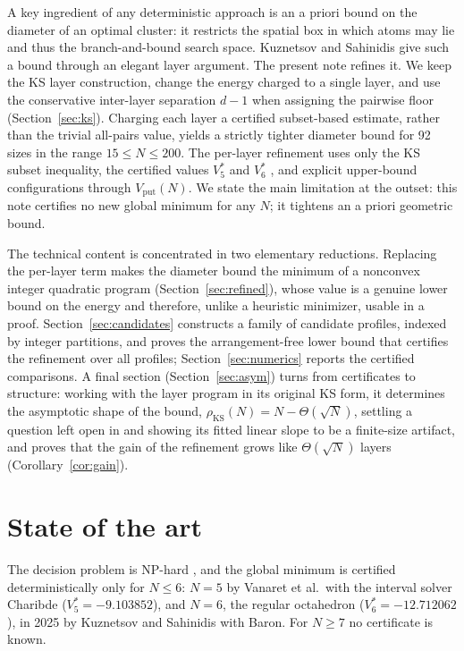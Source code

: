 \documentclass[11pt]{article}
\theoremstyle{remark}
\newcommand{\KS}{\mathrm{KS}}
\newcommand{\vput}{\mathrm{put}}
\begin{document}
A key ingredient of any deterministic approach is an a priori bound on the diameter of an optimal cluster: it restricts the spatial box in which atoms may lie and thus the branch-and-bound search space. Kuznetsov and Sahinidis \cite{ks2025} give such a bound through an elegant layer argument. The present note refines it. We keep the KS layer construction, change the energy charged to a single layer, and use the conservative inter-layer separation $d-1$ when assigning the pairwise floor (Section~\ref{sec:ks}). Charging each layer a certified subset-based estimate, rather than the trivial all-pairs value, yields a strictly tighter diameter bound for 92 sizes in the range $15\le N\le 200$. The per-layer refinement uses only the KS subset inequality, the certified values $V^*_5$ \cite{vanaret2014} and $V^*_6$ \cite{ks2025}, and explicit upper-bound configurations through $V_\vput(N)$. We state the main limitation at the outset: this note certifies no new global minimum for any $N$; it tightens an a priori geometric bound.

The technical content is concentrated in two elementary reductions. Replacing the per-layer term makes the diameter bound the minimum of a nonconvex integer quadratic program (Section~\ref{sec:refined}), whose value is a genuine lower bound on the energy and therefore, unlike a heuristic minimizer, usable in a proof. Section~\ref{sec:candidates} constructs a family of candidate profiles, indexed by integer partitions, and proves the arrangement-free lower bound that certifies the refinement over all profiles; Section~\ref{sec:numerics} reports the certified comparisons. A final section (Section~\ref{sec:asym}) turns from certificates to structure: working with the layer program in its original KS form, it determines the asymptotic shape of the bound, $\rho_\KS(N)=N-\Theta(\sqrt N)$, settling a question left open in \cite{ks2025} and showing its fitted linear slope to be a finite-size artifact, and proves that the gain of the refinement grows like $\Theta(\sqrt N)$ layers (Corollary~\ref{cor:gain}).

\section{State of the art}\label{sec:soa}

The decision problem is NP-hard \cite{wille1985}, and the global minimum is certified deterministically only for $N\le 6$: $N=5$ by Vanaret et al.\ with the interval solver Charibde \cite{vanaret2014,vanaret2020} ($V^*_5=-9.103852$), and $N=6$, the regular octahedron ($V^*_6=-12.712062$), in 2025 by Kuznetsov and Sahinidis \cite{ks2025} with Baron. For $N\ge 7$ no certificate is known.
\end{document}

